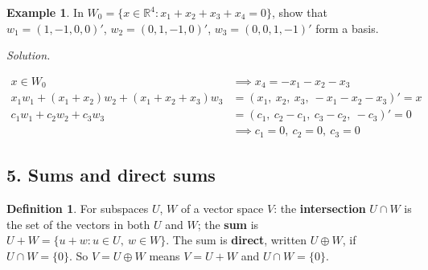 \documentclass[12pt]{article}
\newcommand{\R}{\mathbb R}
\theoremstyle{definition}
\newtheorem{definition}[theorem]{Definition}
\newtheorem{example}[theorem]{Example}
\newcommand{\boardtop}{\vspace*{-\abovedisplayskip}}
\begin{document}
\begin{example}\label{b3.22}
In \(W_0=\{x\in\R^4:x_1+x_2+x_3+x_4=0\}\), show that \(w_1=(1,-1,0,0)'\), \(w_2=(0,1,-1,0)'\), \(w_3=(0,0,1,-1)'\) form a
basis.
\end{example}
\textit{Solution.}
\begin{board}[\(W_0\) is a subspace (Example~\ref{b3.5}(c), \(n=4\)); \(w_1,w_2,w_3\in W_0\): the entries of each
\(w_i\) add up to \(0\). Span and independence:]
\boardtop
\begin{align*}
x\in W_0&\implies x_4=-x_1-x_2-x_3\\
x_1w_1+(x_1+x_2)w_2+(x_1+x_2+x_3)w_3&=(x_1,\ x_2,\ x_3,\ -x_1-x_2-x_3)'=x\\
c_1w_1+c_2w_2+c_3w_3&=(c_1,\ c_2-c_1,\ c_3-c_2,\ -c_3)'=0\\
&\implies c_1=0,\ c_2=0,\ c_3=0
\end{align*}
\end{board}

\subsection*{5. Sums and direct sums}

\begin{definition}\label{b3.30}
For subspaces \(U\), \(W\) of a vector space \(V\): the \textbf{intersection} \(U\cap W\) is the set of the vectors in both
\(U\) and \(W\); the \textbf{sum} is \(U+W=\{u+w:u\in U,\ w\in W\}\). The sum is \textbf{direct}, written \(U\oplus W\), if
\(U\cap W=\{0\}\). So \(V=U\oplus W\) means \(V=U+W\) and \(U\cap W=\{0\}\).
\end{definition}
\end{document}
